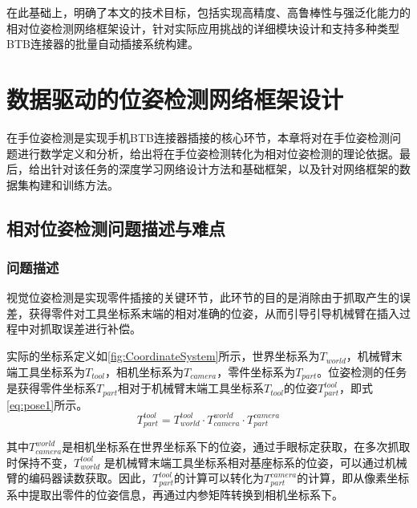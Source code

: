 \documentclass{Diploma}
\begin{document}
在此基础上，明确了本文的技术目标，包括实现高精度、高鲁棒性与强泛化能力的相对位姿检测网络框架设计，针对实际应用挑战的详细模块设计和支持多种类型BTB连接器的批量自动插接系统构建。

\chapter[framework]{数据驱动的位姿检测网络框架设计}
在手位姿检测是实现手机BTB连接器插接的核心环节，本章将对在手位姿检测问题进行数学定义和分析，给出将在手位姿检测转化为相对位姿检测的理论依据。最后，给出针对该任务的深度学习网络设计方法和基础框架，以及针对网络框架的数据集构建和训练方法。

\section{相对位姿检测问题描述与难点}

\subsection{问题描述}
视觉位姿检测是实现零件插接的关键环节，此环节的目的是消除由于抓取产生的误差，获得零件对工具坐标系末端的相对准确的位姿，从而引导引导机械臂在插入过程中对抓取误差进行补偿。

%

实际的坐标系定义如\ref{fig:CoordinateSystem}所示，世界坐标系为$T_{world}$，机械臂末端工具坐标系为$T_{tool}$，相机坐标系为$T_{camera}$，零件坐标系为$T_{part}$。位姿检测的任务是获得零件坐标系$T_{part}$相对于机械臂末端工具坐标系$T_{tool}$的位姿$T_{part}^{tool}$，即式\eqref{eq:pose1}所示。
\begin{equation}
  T_{part}^{tool} =T_{world}^{tool} \cdot T_{camera}^{world} \cdot T_{part}^{camera} \label{eq:pose1}
\end{equation}

其中$T_{camera}^{world}$是相机坐标系在世界坐标系下的位姿，通过手眼标定获取，在多次抓取时保持不变，$T_{world}^{tool}$ 是机械臂末端工具坐标系相对基座标系的位姿，可以通过机械臂的编码器读数获取。因此，$T_{part}^{tool}$的计算可以转化为$T_{part}^{camera}$的计算，即从像素坐标系中提取出零件的位姿信息，再通过内参矩阵转换到相机坐标系下。

%
\end{document}
